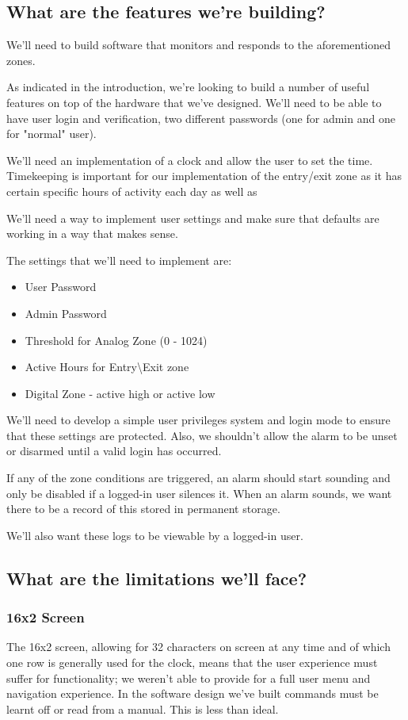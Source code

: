 \documentclass[a4paper,11pt]{article}
\theoremstyle{mytheor}
\begin{document}
\newpage

\subsection{What are the features we're building?}
We'll need to build software that monitors and responds to the aforementioned zones.

As indicated in the introduction, we're looking to build a number of useful features on top of the hardware that we've designed. We'll need to be able to have user login and verification, two different passwords (one for admin and one for "normal" user).

We'll need an implementation of a clock and allow the user to set the time. Timekeeping is important for our implementation of the entry/exit zone as it has certain specific hours of activity each day as well as 

We'll need a way to implement user settings and make sure that defaults are working in a way that makes sense.

The settings that we'll need to implement are:
\begin{itemize}
\item User Password
\item Admin Password
\item Threshold for Analog Zone (0 - 1024)
\item Active Hours for Entry\textbackslash Exit zone
\item Digital Zone - active high or active low
\end{itemize}

We'll need to develop a simple user privileges system and login mode to ensure that these settings are protected. Also, we shouldn't allow the alarm to be unset or disarmed until a valid login has occurred.

If any of the zone conditions are triggered, an alarm should start sounding and only be disabled if a logged-in user silences it. When an alarm sounds, we want there to be a record of this stored in permanent storage.

We'll also want these logs to be viewable by a logged-in user.

\subsection{What are the limitations we'll face?}

\subsubsection{16x2 Screen}
The 16x2 screen, allowing for 32 characters on screen at any time and of which one row is generally used for the clock, means that the user experience must suffer for functionality; we weren't able to provide for a full user menu and navigation experience. In the software design we've built commands must be learnt off or read from a manual. This is less than ideal.
\end{document}
